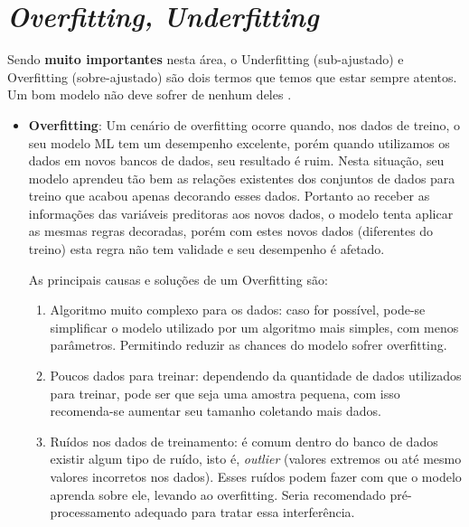 \documentclass[
]{book}
\begin{document}
\hypertarget{overfitting-underfitting}{%
\section{\texorpdfstring{\emph{Overfitting, Underfitting}}{Overfitting, Underfitting}}\label{overfitting-underfitting}}

Sendo \textbf{muito importantes} nesta área, o Underfitting (sub-ajustado) e Overfitting (sobre-ajustado) são dois termos que temos que estar sempre atentos. Um bom modelo não deve sofrer de nenhum deles \citep{silver2013sinal}.

\begin{itemize}
\item
  \textbf{Overfitting}: Um cenário de overfitting ocorre quando, nos dados de treino, o seu modelo ML tem um desempenho excelente, porém quando utilizamos os dados em novos bancos de dados, seu resultado é ruim. Nesta situação, seu modelo aprendeu tão bem as relações existentes dos conjuntos de dados para treino que acabou apenas decorando esses dados. Portanto ao receber as informações das variáveis preditoras aos novos dados, o modelo tenta aplicar as mesmas regras decoradas, porém com estes novos dados (diferentes do treino) esta regra não tem validade e seu desempenho é afetado.

  As principais causas e soluções de um Overfitting são:

  \begin{enumerate}
  \def\labelenumi{\arabic{enumi}.}
  \item
    Algoritmo muito complexo para os dados: caso for possível, pode-se simplificar o modelo utilizado por um algoritmo mais simples, com menos parâmetros. Permitindo reduzir as chances do modelo sofrer overfitting.
  \item
    Poucos dados para treinar: dependendo da quantidade de dados utilizados para treinar, pode ser que seja uma amostra pequena, com isso recomenda-se aumentar seu tamanho coletando mais dados.
  \item
    Ruídos nos dados de treinamento: é comum dentro do banco de dados existir algum tipo de ruído, isto é, \emph{outlier} (valores extremos ou até mesmo valores incorretos nos dados). Esses ruídos podem fazer com que o modelo aprenda sobre ele, levando ao overfitting. Seria recomendado pré-processamento adequado para tratar essa interferência.
  \end{enumerate}
\end{itemize}
\end{document}
